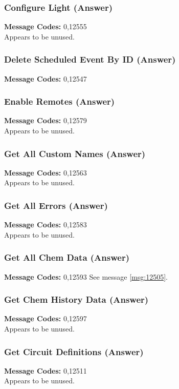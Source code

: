 \documentclass[11pt]{article}
\begin{document}
\subsubsection{Configure Light (Answer)}
\label{msg:12555}
{\bf Message Codes: } 0,12555\\
Appears to be unused.

\subsubsection{Delete Scheduled Event By ID (Answer)}
\label{msg:12547}
{\bf Message Codes: } 0,12547\\

\subsubsection{Enable Remotes (Answer)}
\label{msg:12579}
{\bf Message Codes: } 0,12579\\
Appears to be unused.

\subsubsection{Get All Custom Names (Answer)}
\label{msg:12563}
{\bf Message Codes: } 0,12563\\
Appears to be unused.

\subsubsection{Get All Errors (Answer)}
\label{msg:12583}
{\bf Message Codes: } 0,12583\\
Appears to be unused.

\subsubsection{Get All Chem Data (Answer)}
\label{msg:12593}
{\bf Message Codes: } 0,12593
See message \ref{msg:12505}.

\subsubsection{Get Chem History Data (Answer)}
\label{msg:12597}
{\bf Message Codes: } 0,12597\\
Appears to be unused.

\subsubsection{Get Circuit Definitions (Answer)}
\label{msg:12511}
{\bf Message Codes: } 0,12511\\
Appears to be unused.
\end{document}
